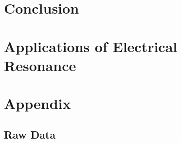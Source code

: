 \documentclass[12pt]{article}
\begin{document}
\section{Conclusion}



\section{Applications of Electrical Resonance}




\newpage







\newpage

\section*{Appendix}

\subsection*{Raw Data}

\listoffigures
\end{document}
